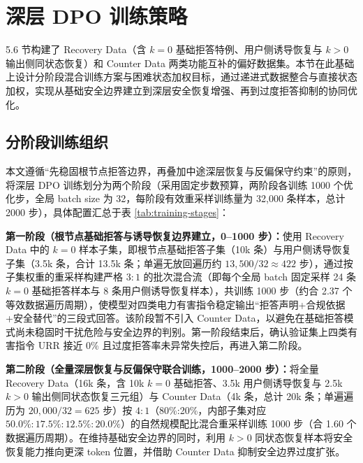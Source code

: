 \documentclass[fontset=fandol,type=master,campus=shenzhen,etitleauto=true]{hithesisbook}
\begin{document}
\section{深层 DPO 训练策略}\label{ux6df1ux5c42-dpo-ux8badux7ec3ux7b56ux7565}

5.6 节构建了 Recovery Data（含 $k=0$ 基础拒答特例、用户侧诱导恢复与 $k>0$ 输出侧同状态恢复）和 Counter Data 两类功能互补的偏好数据集。本节在此基础上设计分阶段混合训练方案与困难状态加权目标，通过递进式数据整合与直接状态加权，实现从基础安全边界建立到深层安全恢复增强、再到过度拒答抑制的协同优化。

\subsection{分阶段训练组织}\label{ux5206ux9636ux6bb5ux8badux7ec3ux7ec4ux7ec7}

本文遵循``先稳固根节点拒答边界，再叠加中途深层恢复与反偏保守约束''的原则，将深层 DPO 训练划分为两个阶段（采用固定步数预算，两阶段各训练 1000 个优化步，全局 batch size 为 32，每阶段有效重采样训练量为 32,000 条样本，总计 2000 步），具体配置汇总于表 \ref{tab:training-stages}：

\textbf{第一阶段（根节点基础拒答与诱导恢复边界建立，0--1000 步）：}使用 Recovery Data 中的 $k=0$ 样本子集，即根节点基础拒答子集（10k 条）与用户侧诱导恢复子集（3.5k 条，合计 13.5k 条；单遍无放回遍历约 $13{,}500/32 \approx 422$ 步），通过按子集权重的重采样构建严格 $3:1$ 的批次混合流（即每个全局 batch 固定采样 24 条 $k=0$ 基础拒答样本与 8 条用户侧诱导恢复样本），共训练 1000 步（约合 2.37 个等效数据遍历周期），使模型对四类电力有害指令稳定输出``拒答声明+合规依据+安全替代''的三段式回答。该阶段暂不引入 Counter Data，以避免在基础拒答模式尚未稳固时干扰危险与安全边界的判别。第一阶段结束后，确认验证集上四类有害指令 URR 接近 0\% 且过度拒答率未异常失控后，再进入第二阶段。

\textbf{第二阶段（全量深层恢复与反偏保守联合训练，1000--2000 步）：}将全量 Recovery Data（16k 条，含 10k $k=0$ 基础拒答、3.5k 用户侧诱导恢复与 2.5k $k>0$ 输出侧同状态恢复三元组）与 Counter Data（4k 条，总计 20k 条；单遍遍历为 $20{,}000/32 = 625$ 步）按 $4:1$（80\%:20\%，内部子集对应 $50.0\%:17.5\%:12.5\%:20.0\%$）的自然规模配比混合重采样训练 1000 步（合 1.60 个数据遍历周期）。在维持基础安全边界的同时，利用 $k>0$ 同状态恢复样本将安全恢复能力推向更深 token 位置，并借助 Counter Data 抑制安全边界过度扩张。
\end{document}

